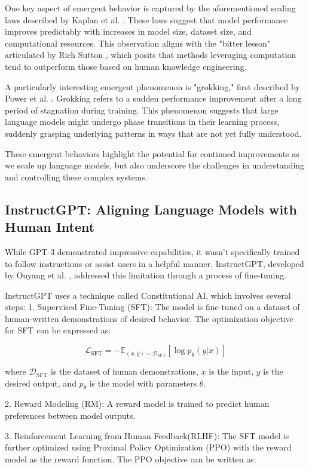 \documentclass[a4paper, oneside]{discothesis}
\begin{document}
One key aspect of emergent behavior is captured by the aforementioned scaling laws described by Kaplan et al. \cite{kaplan2020scaling}. These laws suggest that model performance improves predictably with increases in model size, dataset size, and computational resources. This observation aligns with the "bitter lesson" articulated by Rich Sutton \cite{sutton2019bitter}, which posits that methods leveraging computation tend to outperform those based on human knowledge engineering.

A particularly interesting emergent phenomenon is "grokking," first described by Power et al. \cite{power2022grokking}. Grokking refers to a sudden performance improvement after a long period of stagnation during training. This phenomenon suggests that large language models might undergo phase transitions in their learning process, suddenly grasping underlying patterns in ways that are not yet fully understood.

These emergent behaviors highlight the potential for continued improvements as we scale up language models, but also underscore the challenges in understanding and controlling these complex systems.

\subsection{InstructGPT: Aligning Language Models with Human Intent}
While GPT-3 demonstrated impressive capabilities, it wasn't specifically trained to follow instructions or assist users in a helpful manner. InstructGPT, developed by Ouyang et al. \cite{ouyang2022training}, addressed this limitation through a process of fine-tuning.

InstructGPT uses a technique called Constitutional AI, which involves several steps:
1. Supervised Fine-Tuning (SFT): The model is fine-tuned on a dataset of human-written demonstrations of desired behavior. The optimization objective for SFT can be expressed as:

   \[\mathcal{L}_{\text{SFT}} = -\mathbb{E}_{(x,y)\sim \mathcal{D}_{\text{SFT}}}[\log p_\theta(y|x)]\]

   where $\mathcal{D}_{\text{SFT}}$ is the dataset of human demonstrations, $x$ is the input, $y$ is the desired output, and $p_\theta$ is the model with parameters $\theta$.

2. Reward Modeling (RM): A reward model is trained to predict human preferences between model outputs.

3. Reinforcement Learning from Human Feedback(RLHF): The SFT model is further optimized using Proximal Policy Optimization (PPO) with the reward model as the reward function. The PPO objective can be written as:
\end{document}
